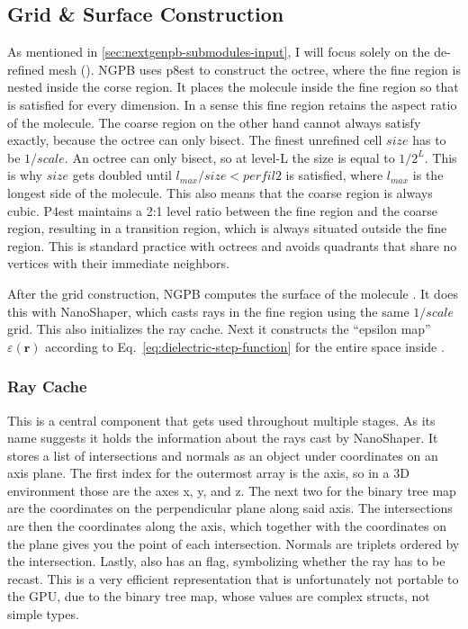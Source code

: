 \subsection{Grid \& Surface Construction}
\label{sec:nextgenpb-submodules-grid-surface-construction}

As mentioned in \ref{sec:nextgenpb-submodules-input}, I will focus solely on the de-refined mesh ().
NGPB uses p8est to construct the octree, where the fine region is nested inside the corse region.
It places the molecule inside the fine region so that 
is satisfied for every dimension.
In a sense this fine region retains the aspect ratio of the molecule.
The coarse region on the other hand cannot always satisfy  exactly, because the octree can only bisect.
The finest unrefined cell $size$ has to be $1/scale$.
An octree can only bisect, so at level-L the size is equal to $1/2^L$.
This is why $size$ gets doubled until $l_{max}/size < perfil2$ is satisfied, where $l_{max}$ is the longest side of the molecule.
This also means that the coarse region is always cubic.
P4est maintains a 2:1 level ratio between the fine region and the coarse region, resulting in a transition region, which is always situated outside the fine region.
This is standard practice with octrees and avoids quadrants that share no vertices with their immediate neighbors.

After the grid construction, NGPB computes the surface of the molecule .
It does this with NanoShaper, which casts rays in the fine region using the same $1/scale$ grid.
This also initializes the ray cache.
Next it constructs the ``epsilon map'' $\varepsilon(\mathbf{r})$ according to Eq.~\eqref{eq:dielectric-step-function} for the entire space inside .

\subsubsection{Ray Cache}

This is a central component that gets used throughout multiple stages.
As its name suggests it holds the information about the rays cast by NanoShaper.
It stores a list of intersections and normals as an object  under coordinates on an axis plane. 
The first index for the outermost array is the axis, so in a 3D environment those are the axes x, y, and z. 
The next two for the binary tree map are the coordinates on the perpendicular plane along said axis.
The intersections are then the coordinates along the axis, which together with the coordinates on the plane gives you the point of each intersection.
Normals are triplets ordered by the intersection.
Lastly,  also has an  flag, symbolizing whether the ray has to be recast.
This is a very efficient representation that is unfortunately not portable to the GPU, due to the binary tree map, whose values are complex structs, not simple types.

